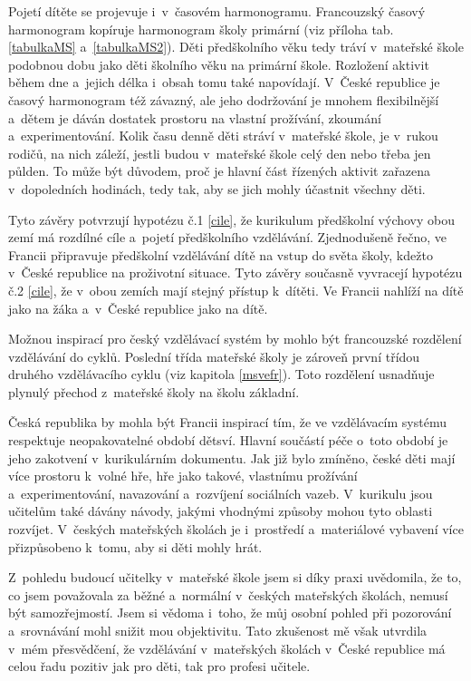 Pojetí dítěte se projevuje i~v~časovém harmonogramu. Francouzský časový harmonogram kopíruje harmonogram školy primární (viz příloha tab. \ref{tabulkaMS} a~\ref{tabulkaMS2}). Děti předškolního věku tedy tráví v~mateřské škole podobnou dobu jako děti školního věku na primární škole. Rozložení aktivit během dne a~jejich délka i~obsah tomu také napovídají. V~České republice je časový harmonogram též závazný, ale jeho dodržování je mnohem flexibilnější a~dětem je dáván dostatek prostoru na vlastní prožívání, zkoumání a~experimentování. Kolik času denně  děti stráví v~mateřské škole, je v~rukou rodičů, na nich záleží, jestli budou v~mateřské škole celý den nebo třeba jen půlden. To může být důvodem, proč je hlavní část řízených aktivit zařazena v~dopoledních hodinách, tedy tak, aby se jich mohly účastnit všechny děti. 

Tyto závěry potvrzují hypotézu č.1 \ref{cile}, že kurikulum předškolní výchovy obou zemí má rozdílné cíle a~pojetí předškolního vzdělávání. Zjednodušeně řečno, ve Francii připravuje předškolní vzdělávání dítě na vstup do světa školy, kdežto v~České republice na proživotní situace. Tyto závěry současně vyvracejí hypotézu č.2 \ref{cile}, že v~obou zemích mají stejný přístup k~dítěti. Ve Francii nahlíží na dítě jako na žáka a~v~České republice jako na dítě. 

Možnou inspirací pro český vzdělávací systém by mohlo být francouzské rozdělení vzdělávání do cyklů. Poslední třída mateřské školy je zároveň první třídou druhého vzdělávacího cyklu (viz kapitola \ref{msvefr}). Toto rozdělení usnadňuje plynulý přechod z~mateřské školy na školu základní. 

Česká republika by mohla být Francii inspirací tím, že ve vzdělávacím systému respektuje neopakovatelné období dětsví. Hlavní součástí péče o~toto období je jeho zakotvení v~kurikulárním dokumentu. Jak již bylo zmíněno, české děti mají více prostoru k~volné hře, hře jako takové, vlastnímu prožívání a~experimentování, navazování a~rozvíjení sociálních vazeb. V~kurikulu jsou učitelům také dávány návody, jakými vhodnými způsoby mohou tyto oblasti rozvíjet. V~českých mateřských školách je i~prostředí a~materiálové vybavení více přizpůsobeno k~tomu, aby si děti mohly hrát.

Z~pohledu budoucí učitelky v~mateřské škole jsem si díky praxi uvědomila, že to, co jsem považovala za běžné a~normální v~českých mateřských školách, nemusí být samozřejmostí. Jsem si vědoma i~toho, že můj osobní pohled při pozorování a~srovnávání mohl snižit mou objektivitu. Tato zkušenost mě však utvrdila v~mém přesvědčení, že vzdělávání v~mateřských školách v~České republice má celou řadu pozitiv jak pro děti, tak pro profesi učitele. 